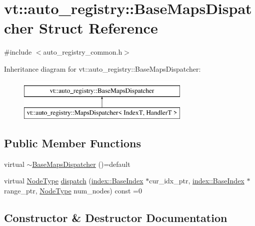 \hypertarget{structvt_1_1auto__registry_1_1_base_maps_dispatcher}{}\section{vt\+:\+:auto\+\_\+registry\+:\+:Base\+Maps\+Dispatcher Struct Reference}
\label{structvt_1_1auto__registry_1_1_base_maps_dispatcher}


{\ttfamily \#include $<$auto\+\_\+registry\+\_\+common.\+h$>$}

Inheritance diagram for vt\+:\+:auto\+\_\+registry\+:\+:Base\+Maps\+Dispatcher\+:\begin{figure}[H]
\begin{center}
\leavevmode
\includegraphics[height=2.000000cm]{structvt_1_1auto__registry_1_1_base_maps_dispatcher}
\end{center}
\end{figure}
\subsection*{Public Member Functions}
\begin{DoxyCompactItemize}
\item 
virtual \hyperlink{structvt_1_1auto__registry_1_1_base_maps_dispatcher_ac56e39e812d2d4085dcd676f4da77023}{$\sim$\+Base\+Maps\+Dispatcher} ()=default
\item 
virtual \hyperlink{namespacevt_a866da9d0efc19c0a1ce79e9e492f47e2}{Node\+Type} \hyperlink{structvt_1_1auto__registry_1_1_base_maps_dispatcher_a36755202b288d1cb4eed6a57524b6398}{dispatch} (\hyperlink{structvt_1_1index_1_1_base_index}{index\+::\+Base\+Index} $\ast$cur\+\_\+idx\+\_\+ptr, \hyperlink{structvt_1_1index_1_1_base_index}{index\+::\+Base\+Index} $\ast$range\+\_\+ptr, \hyperlink{namespacevt_a866da9d0efc19c0a1ce79e9e492f47e2}{Node\+Type} num\+\_\+nodes) const =0
\end{DoxyCompactItemize}


\subsection{Constructor \& Destructor Documentation}
\mbox{\label{structvt_1_1auto__registry_1_1_base_maps_dispatcher_ac56e39e812d2d4085dcd676f4da77023}} 
